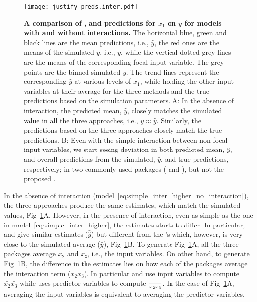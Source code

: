 \begin{figure}
\begin{center}
\texttt{[image: justify\_preds.inter.pdf]}
\end{center}
\caption{{\bf A comparison of ,  and  predictions for $x_1$ on $y$ for models with and without interactions.}
The horizontal blue, green and black lines are the mean predictions, i.e., $\bar{\hat{y}}$, the red ones are the means of the simulated $y$, i.e., $\bar{y}$, while the vertical dotted grey lines are the means of the corresponding focal input variable. The grey points are the binned simulated $y$. The trend lines represent the corresponding $\hat{y}$ at various levels of $x_1$, while holding the other input variables at their average for the three methods and the true predictions based on the simulation parameters. A: In the absence of interaction, the predicted mean, $\bar{\hat{y}}$, closely matches the simulated value in all the three approaches, i.e., $\bar{y} \approx \bar{\hat{y}}$. Similarly, the predictions based on the three approaches closely match the true predictions. B: Even with the simple interaction between non-focal input variables, we start seeing deviation in both predicted mean, $\bar{\hat{y}}$, and overall predictions from the simulated, $\bar{y}$, and true predictions, respectively; in two commonly used packages ( and ), but not the proposed .}
\label{fig:justify_plots}
\end{figure}
%
In the absence of interaction (model~\ref{eq:simple_inter_higher_no_interaction}), the three approaches produce the same estimates, which match the simulated values, Fig~\ref{fig:justify_plots}A. However, in the presence of interaction, even as simple as the one in model~\ref{eq:simple_inter_higher}, the estimates starts to differ. In particular,  and  give similar estimates ($\bar{\hat{y}}$) but different from the 's which, however, is very close to the simulated average ($\bar{y}$), Fig~\ref{fig:justify_plots}B. To generate Fig~\ref{fig:justify_plots}A, all the three packages average $x_2$ and $x_3$, i.e., the input variables. On other hand, to generate Fig~\ref{fig:justify_plots}B, the difference in the estimates lies on how each of the packages average the interaction term ($x_2x_3$). In particular  and  use input variables to compute $\bar{x_2}\bar{x_3}$ while  uses predictor variables to compute $\over{x_2x_3}$. In the case of Fig~\ref{fig:justify_plots}A, averaging the input variables is equivalent to averaging the predictor variables.

